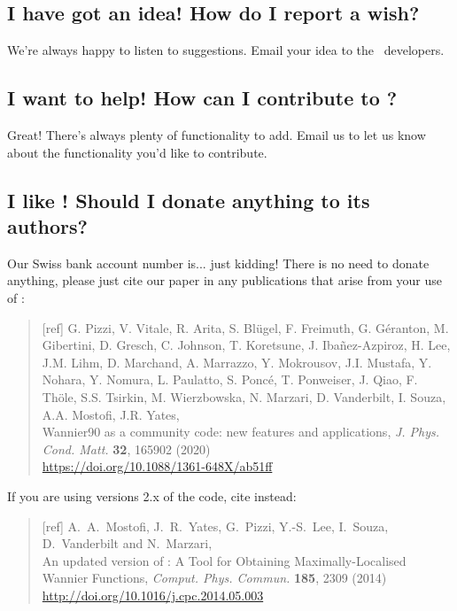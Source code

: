 \subsection{I have got an idea! How do I report a wish?}

We're always happy to listen to suggestions. Email your idea to the
  \wannier\ developers.

\subsection{I want to help! How can I contribute to \wannier?}

Great! There's always plenty of functionality to add. Email us
to let us know about the functionality you'd like to contribute.

\subsection{I like \wannier! Should I donate anything to its authors?}

Our Swiss bank account number is... just kidding! There is no need to
donate anything, please just cite our paper in any publications that
arise from your use of \wannier:

\begin{quote}
[ref] G. Pizzi, V. Vitale, R. Arita, S. Bl\"ugel, F. Freimuth, G. G\'eranton,
   M. Gibertini, D. Gresch, C. Johnson, T. Koretsune, J. Iba\~nez-Azpiroz,
   H. Lee, J.M. Lihm, D. Marchand, A. Marrazzo, Y. Mokrousov, J.I. Mustafa,
   Y. Nohara, Y. Nomura, L. Paulatto, S. Ponc\'e, T. Ponweiser, J. Qiao,
   F. Th\"ole, S.S. Tsirkin, M. Wierzbowska, N. Marzari, D. Vanderbilt,
   I. Souza, A.A. Mostofi, J.R. Yates,\\
   Wannier90 as a community code: new features and
  applications, \emph{J. Phys. Cond. Matt.} {\bf 32}, 165902 (2020)\\
  \url{https://doi.org/10.1088/1361-648X/ab51ff}
\end{quote}

If you are using versions 2.x of the code, cite instead:

\begin{quote}
[ref] A.~A.~Mostofi, J.~R.~Yates, G.~Pizzi, Y.-S.~Lee, I.~Souza, D.~Vanderbilt
and N.~Marzari,\\
An updated version of \wannier:
A Tool for Obtaining Maximally-Localised Wannier
  Functions, {\it Comput. Phys. Commun.} {\bf 185}, 2309 (2014)\\
\url{http://doi.org/10.1016/j.cpc.2014.05.003}
\end{quote}

